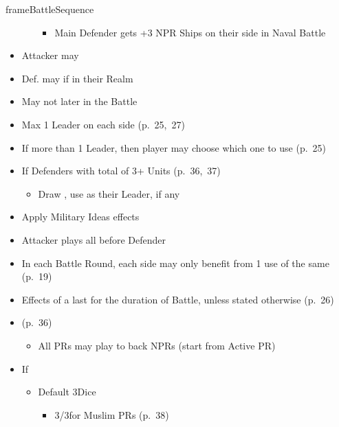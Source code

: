 \documentclass[10pt]{article}
\newlength{\fhBattleSequence} \setlength\fhBattleSequence{50\baselineskip}
\begin{document}
\begin{dynamiccontents*}{frameBattleSequence}
\begin{eubox}{\fhBattleSequence}
\begin{multicols}{2}
\begin{itemize}
\begin{itemize}
{				\begin{itemize}
					\item Main Defender gets +3 NPR Ships on their side in Naval Battle
				\end{itemize}
				}
			\end{itemize}
			\item Attacker may 
			\item Def. may  if in their Realm
			\item May not  later in the Battle
			\item Max 1 Leader on each side (p.~25,~27)
			\item If more than 1 Leader, then player may choose which one to use (p.~25)
			\item If  Defenders with total of 3+ Units (p.~36,~37)
			\begin{itemize}
				\item Draw \milcard, use as their Leader, if any
			\end{itemize}
			\item Apply Military Ideas effects
		\end{itemize}
		\begin{itemize}
			\item Attacker plays all \battleactions before Defender
			\item In each Battle Round, each side may only benefit from 1 use of the same \battleaction (p.~19)
			\item Effects of a \battleaction last for the duration of Battle, unless stated otherwise (p.~26)
			\item {} (p.~36)
			\begin{itemize}
				\item All PRs may play \battleactions to back NPRs (start from Active PR)
			\end{itemize}
		\end{itemize}
		\begin{itemize}
			\item If 
			\begin{itemize}
				\item Default 3\infantry Dice
				\begin{itemize}
					\item 3\infantry/3\cavalry for Muslim PRs (p.~38)
				\end{itemize}

\end{itemize}
\end{itemize}
\end{multicols}
\end{eubox}
\end{dynamiccontents*}
\end{document}
